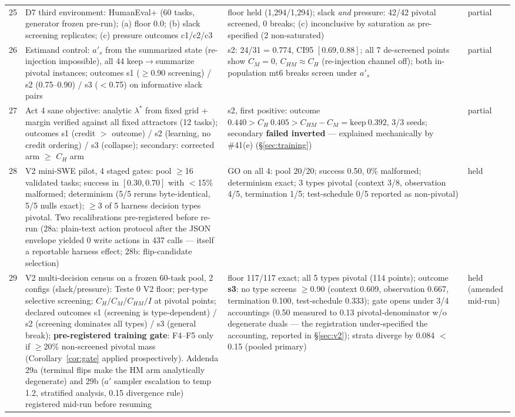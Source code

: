 \documentclass{article}
\theoremstyle{remark}
\begin{document}
\begin{table}[h]
{\begin{tabular}{clll}
25 & D7 third environment: HumanEval+ (60 tasks, generator frozen pre-run); (a) floor $0.0$; (b) slack screening replicates; (c) pressure outcomes c1/c2/c3 & floor held (1{,}294/1{,}294); slack \emph{and} pressure: 42/42 pivotal screened, 0 breaks; (c) inconclusive by saturation as pre-specified (2 non-saturated) & partial \\
26 & Estimand control: $a'_s$ from the summarized state (re-injection impossible), all 44 keep$\to$summarize pivotal instances; outcomes s1 ($\geq$0.90 screening) / s2 (0.75--0.90) / s3 ($<$0.75) on informative slack pairs & s2: 24/31 = 0.774, CI95 $[0.69,0.88]$; all 7 de-screened points show $C_M=0$, $C_{HM} \approx C_H$ (re-injection channel off); both in-population mt6 breaks screen under $a'_s$ & partial \\
27 & Act 4 sane objective: analytic $\lambda^{*}$ from fixed grid + margin verified against all fixed attractors (12 tasks); outcomes s1 (credit $>$ outcome) / s2 (learning, no credit ordering) / s3 (collapse); secondary: corrected arm $\geq$ $C_H$ arm & s2, first positive: outcome $0.440 > C_H\ 0.405 > C_{HM}-C_M = \text{keep}\ 0.392$, 3/3 seeds; secondary \textbf{failed inverted} --- explained mechanically by \#41(e) (\S\ref{sec:training}) & partial \\
28 & V2 mini-SWE pilot, 4 staged gates: pool $\geq$16 validated tasks; success in $[0.30,0.70]$ with $<$15\% malformed; determinism (5/5 reruns byte-identical, 5/5 nulls exact); $\geq$3 of 5 harness decision types pivotal. Two recalibrations pre-registered before re-run (28a: plain-text action protocol after the JSON envelope yielded 0 write actions in 437 calls --- itself a reportable harness effect; 28b: flip-candidate selection) & GO on all 4: pool 20/20; success 0.50, 0\% malformed; determinism exact; 3 types pivotal (context 3/8, observation 4/5, termination 1/5; test-schedule 0/5 reported as non-pivotal) & held \\
29 & V2 multi-decision census on a frozen 60-task pool, 2 configs (slack/pressure): Teste 0 V2 floor; per-type selective screening; $C_H/C_M/C_{HM}/I$ at pivotal points; declared outcomes s1 (screening is type-dependent) / s2 (screening dominates all types) / s3 (general break); \textbf{pre-registered training gate}: F4--F5 only if $\geq$20\% non-screened pivotal mass (Corollary~\ref{cor:gate} applied prospectively). Addenda 29a (terminal flips make the HM arm analytically degenerate) and 29b ($a'$ sampler escalation to temp 1.2, stratified analysis, 0.15 divergence rule) registered mid-run before resuming & floor 117/117 exact; all 5 types pivotal (114 points); outcome \textbf{s3}: no type screens $\geq$0.90 (context 0.609, observation 0.667, termination 0.100, test-schedule 0.333); gate opens under 3/4 accountings (0.50 measured to 0.13 pivotal-denominator w/o degenerate duals --- the registration under-specified the accounting, reported in \S\ref{sec:v2}); strata diverge by 0.084 $<$ 0.15 (pooled primary) & held (amended mid-run) \\

\end{tabular}}
\end{table}
\end{document}

